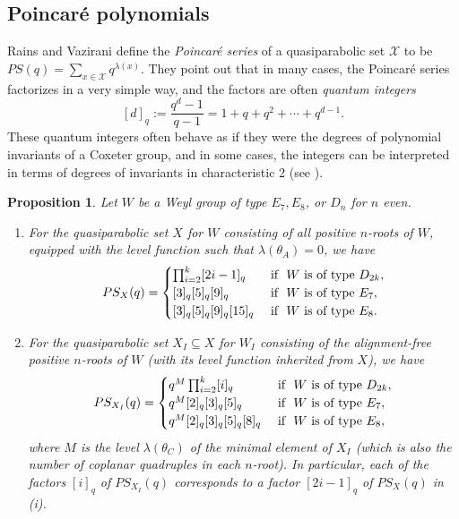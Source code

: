 \documentclass[11pt]{amsart}
\theoremstyle{plain}
\newtheorem{prop}[theorem]{Proposition}
\theoremstyle{definition}
\theoremstyle{remark}
\numberwithin{equation}{subsection}
\newcommand{\se}{\subseteq}
\begin{document}
\subsection{Poincar\'e polynomials}
Rains and Vazirani \cite[Section 8]{rains13} define the {\it Poincar\'e series}
of a quasiparabolic set $\mathcal{X}$ to be $PS(q) = \sum_{x \in \mathcal{X}}q^{\lambda(x)}$. They point
out that in many cases, the Poincar\'e series factorizes in a very simple way,
and the factors are often {\it quantum integers} $$ [d]_q := \frac{q^d-1}{q-1} =
1 + q + q^2 + \cdots + q^{d-1} .$$ These quantum integers often behave as if
they were the degrees of polynomial invariants of a Coxeter group, and in some
cases, the integers can be interpreted in terms of degrees of invariants in
characteristic 2 (see \cite[Section 8, Example 9.4]{rains13}).

\begin{prop}\label{prop:poincare}
Let $W$ be a Weyl group of type $E_7, E_8$, or $D_n$ for $n$ even.
\begin{enumerate}
    \item[{\rm (i)}] For the quasiparabolic set $X$ for $W$ consisting of all
     positive $n$-roots of $W$, equipped with the level function such that
     $\lambda(\theta_A)=0$,  we have $$ PS_X(q) =
     \begin{cases} \prod_{i = 2}^k [2i-1]_q & \text{\ if \ } W \text{\ is\ of\
      type\ } D_{2k},\\ [3]_q[5]_q[9]_q & \text{\ if \ } W \text{\ is\ of\ type\
      } E_7, \\ [3]_q[5]_q[9]_q[15]_q & \text{\ if \ } W \text{\ is\ of\ type\ }
      E_8.
  \end{cases} $$
\item[{\rm (ii)}] For the quasiparabolic set $X_I\se X$ for $W_I$ consisting of
     the alignment-free positive $n$-roots of $W$ (with its level function
     inherited from $X$), we have $$ PS_{X_I}(q) =
     \begin{cases} q^M\prod_{i = 2}^k [i]_q & \text{\ if \ } W \text{\ is\ of\
      type\ } D_{2k},\\ q^M[2]_q[3]_q[5]_q & \text{\ if \ } W \text{\ is\ of\
      type\ } E_7, \\ q^M[2]_q[3]_q[5]_q[8]_q & \text{\ if \ } W \text{\ is\ of\
      type\ } E_8,
  \end{cases} $$ where $M$ is the level $\lambda(\theta_C)$ of the minimal
    element of $X_I$ (which is also the number of coplanar quadruples in each
    $n$-root).  In particular, each of  the factors $[i]_q$ of $PS_{X_I}(q)$
    corresponds to a factor $[2i-1]_q$ of $PS_X(q)$ in (i).
    \end{enumerate}
\end{prop}
\end{document}
